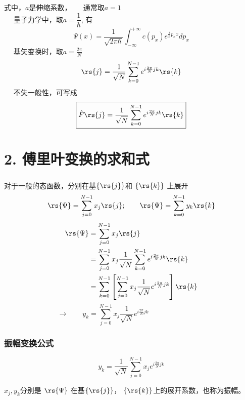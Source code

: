 \begin{frame}
    \frametitle{}
    {\Bullet} 式中，$a$是伸缩系数，
    $\hspace{1em}$ 通常取$a=1$ \\
    $\hspace{1em}$ 量子力学中，取$a=\dfrac{1}{\hbar}$, 有 
    \[ \Psi(x) = \frac{1}{\sqrt{2\pi \hbar}} \int_{-\infty}^{+\infty} c(p_x) e^{\frac{i}{\hbar}p_x x} dp_x\]
    $\hspace{1em}$ 基矢变换时，取$a=\frac{2\pi}{N}$ \\
    \[ \rs{j} = \frac{1}{\sqrt{N}} \sum_{k=0} ^{N-1} e^{i \frac{2\pi}{N} jk} \rs{k}\]
    $\hspace{1em}$ 不失一般性，可写成 \[ \boxed{\hat{F} \rs{j} = \frac{1}{\sqrt{N}} \sum_{k=0} ^{N-1} e^{i \frac{2\pi}{N} jk} \rs{k}}\]
\end{frame}

\section{2. 傅里叶变换的求和式}

\begin{frame}
    \frametitle{}
    对于一般的态函数，分别在基$\{ \rs{j}\}$和 $\{ \rs{k}\}$ 上展开
    \[\rs{\Psi} =\sum_{j=0} ^{N-1} x_j \rs{j}; \qquad \rs{\Psi} =\sum_{k=0} ^{N-1} y_k \rs{k}\]
    \[\begin{aligned}
        \rs{\Psi} &=\sum_{j=0} ^{N-1} x_j \rs{j} \\
        &=\sum_{j=0} ^{N-1} x_j \frac{1}{\sqrt{N}} \sum_{k=0} ^{N-1} e^{i \frac{2\pi}{N} jk} \rs{k} \\
        &=\sum_{k=0} ^{N-1} \left[\sum_{j=0} ^{N-1} x_j \frac{1}{\sqrt{N}}  e^{i \frac{2\pi}{N} jk} \right]\rs{k} 
    \end{aligned}\]
    \[ \to \qquad y_k = \sum_{j=0} ^{N-1} x_j \frac{1}{\sqrt{N}}  e^{i \frac{2\pi}{N} jk} \qquad \qquad \qquad \qquad\]
\end{frame}

\begin{frame}
    \frametitle{振幅变换公式}
    \[\boxed{y_k = \frac{1}{\sqrt{N}} \sum_{j=0} ^{N-1} x_j  e^{i \frac{2\pi}{N} jk} } \] \vspace{2em}

    $x_j, y_k$分别是 $\rs{\Psi}$ 在基$\{ \rs{j}\}$， $\{ \rs{k}\}$上的展开系数，也称为振幅。 
\end{frame}

